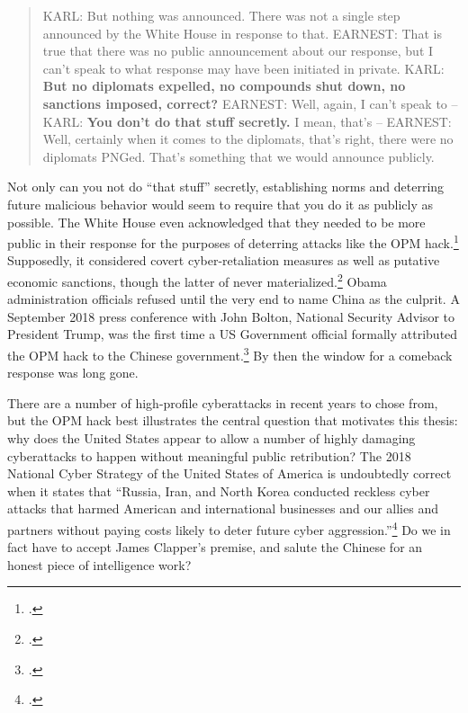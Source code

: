 \documentclass{memoir}
\begin{document}
\begin{refsegment}
\begin{quote}
KARL: But nothing was announced. There was not a single step announced by the White House in response to that.
\newline \newline
EARNEST: That is true that there was no public announcement about our response, but I can't speak to what response may have been initiated in private.
\newline \newline
KARL: \textbf{But no diplomats expelled, no compounds shut down, no sanctions imposed, correct?}
\newline \newline
EARNEST: Well, again, I can't speak to --
\newline \newline
KARL: \textbf{You don't do that stuff secretly.}  I mean, that's --
\newline \newline
EARNEST: Well, certainly when it comes to the diplomats, that's right, there were no diplomats PNGed. That's something that we would announce publicly.
\end{quote}
Not only can you not do ``that stuff'' secretly, establishing norms and deterring future malicious behavior would seem to require that you do it as publicly as possible. The White House even acknowledged that they needed to be more public in their response for the purposes of deterring attacks like the OPM hack.\footcite{sanger_u.s._2016} Supposedly, it considered covert cyber-retaliation measures as well as putative economic sanctions, though the latter of never materialized.\footcite{nakashima_hacks_2015} Obama administration officials refused until the very end to name China as the culprit. A September 2018 press conference with John Bolton, National Security Advisor to President Trump, was the first time a US Government official formally attributed the OPM hack to the Chinese government.\footcite{sanger_trump_2018} By then the window for a comeback response was long gone.

There are a number of high-profile cyberattacks in recent years to chose from, but the OPM hack best illustrates the central question that motivates this thesis: why does the United States appear to allow a number of highly damaging cyberattacks to happen without meaningful public retribution? The 2018 National Cyber Strategy of the United States of America is undoubtedly correct when it states that ``Russia, Iran, and North Korea conducted reckless cyber attacks that harmed American and international businesses and our allies and partners without paying costs likely to deter future cyber aggression.''\footcite{trump_national_2018} Do we in fact have to accept James Clapper's premise, and salute the Chinese for an honest piece of intelligence work?


\end{refsegment}
\end{document}
